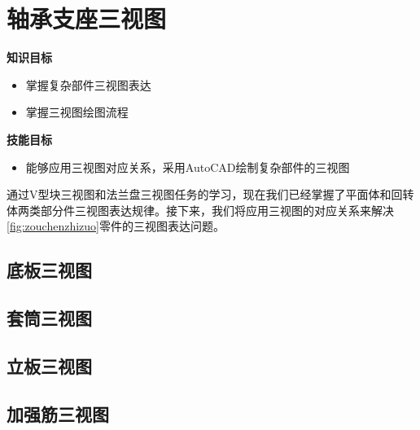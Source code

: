 \section{轴承支座三视图}

{\bfseries 知识目标}
\begin{itemize}
\item 掌握复杂部件三视图表达
\item 掌握三视图绘图流程
\end{itemize}

{\bfseries 技能目标}
\begin{itemize}
\item 能够应用三视图对应关系，采用AutoCAD绘制复杂部件的三视图
\end{itemize}

通过V型块三视图和法兰盘三视图任务的学习，现在我们已经掌握了平面体和回转体两类部分件三视图表达规律。接下来，我们将应用三视图的对应关系来解决\ref{fig:zouchenzhizuo}零件的三视图表达问题。

\subsection{底板三视图}

\subsection{套筒三视图}

\subsection{立板三视图}

\subsection{加强筋三视图}
\endinput